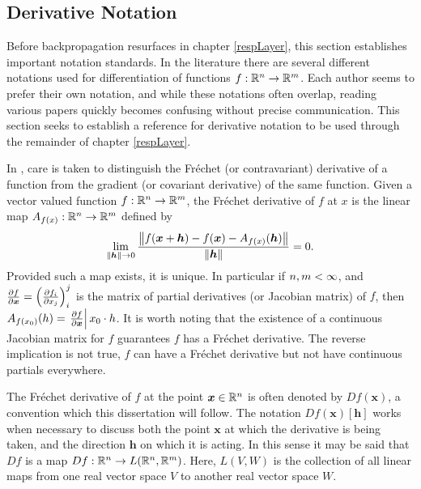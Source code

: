 \subsection{Derivative Notation}\label{subsect:derivNotation}

Before backpropagation resurfaces in chapter \ref{respLayer}, this section establishes important notation standards.  In the literature \cite{abraham1967transversal, manton2012differential, magnus1985matrix, matGradChain} there are several different notations used for differentiation of functions \( f:\mathbb R^n\rightarrow \mathbb R^m \). Each author seems to prefer their own notation, and while these notations often overlap, reading various papers quickly becomes confusing without precise communication. This section seeks to establish a reference for derivative notation to be used through the remainder of chapter \ref{respLayer}.

In \citep{patternnet}, care is taken to distinguish the Fr\'{e}chet (or contravariant) derivative of a function from the gradient (or covariant derivative) of the same function. Given a vector valued function \( f:\mathbb R^n\rightarrow\mathbb R^m \), the Fr\'{e}chet derivative of \( f \) at \(x\) is the linear map \( A_{ f(x)}:\mathbb R^n\rightarrow\mathbb R^m \) defined by
\begin{equation}\label{eqn:frechetDefn}
	\lim_{\norm{\bm h}\rightarrow 0} \frac{\norm{f(\bm x+\bm h)-f(\bm x)-A_{f(x)}(\bm h)}}{\norm{\bm h}}=0.
\end{equation}
Provided such a map exists, it is unique.  In particular if \( n,m<\infty \), and \( \pdv{f}{\bm x} = \left(\pdv{f_i}{x_j}\right)_i^j \) is the matrix of partial derivatives (or Jacobian matrix) of \( f \), then \( A_{f(x_0)}(h) = \eval{\pdv{f}{\bm x}}{x_0}\cdot h \).  It is worth noting that the existence of a continuous Jacobian matrix for \( f \) guarantees \( f \) has a Fr\'{e}chet derivative.  The reverse implication is not true, \( f \) can have a Fr\'{e}chet derivative but not have continuous partials everywhere.

The Fr\'{e}chet derivative of \( f \) at the point \( \bm x\in \mathbb R^n \) is often denoted by \( Df(\bm x) \), a convention which this dissertation will follow.  The notation \( Df(\bm x)[\bm h] \) works when necessary to discuss both the point \( \bm x \) at which the derivative is being taken, and the direction \( \bm h \) on which it is acting. In this sense it may be said that \( Df \) is a map \( Df:\mathbb R^n\rightarrow L(\mathbb R^n,\mathbb R^m)\). Here, \( L(V,W) \) is the collection of all linear maps from one real vector space \( V \) to another real vector space \( W \).  

